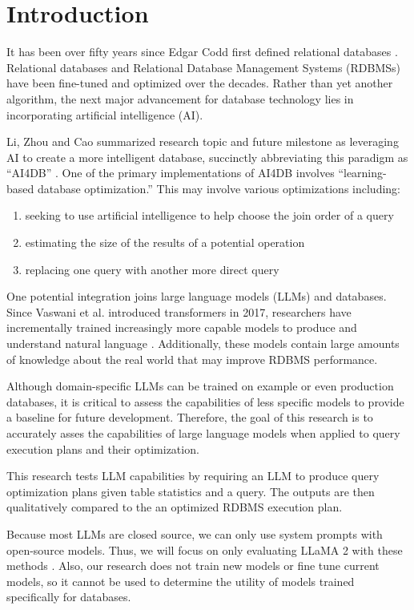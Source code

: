 \section{Introduction}
It has been over fifty years since Edgar Codd first defined relational databases \cite{codd1970}. Relational databases and Relational Database Management Systems (RDBMSs) have been fine-tuned and optimized over the decades. Rather than yet another algorithm, the next major advancement for database technology lies in incorporating artificial intelligence (AI).

Li, Zhou and Cao summarized research topic and future milestone as leveraging AI to create a more intelligent database, succinctly abbreviating this paradigm as ``AI4DB'' \cite{li2021}. One of the primary implementations of AI4DB involves ``learning-based database optimization.'' This may involve various optimizations including:

\begin{enumerate}
  \item seeking to use artificial intelligence to help choose the join order of a query
  \item estimating the size of the results of a potential operation
  \item replacing one query with another more direct query
\end{enumerate}

One potential integration joins large language models (LLMs) and databases. Since Vaswani et al. introduced transformers in 2017, researchers have incrementally trained increasingly more capable models to produce and understand natural language \cite{vaswani2017}. Additionally, these models contain large amounts of knowledge about the real world that may improve RDBMS performance.

Although domain-specific LLMs can be trained on example or even production databases, it is critical to assess the capabilities of less specific models to provide a baseline for future development. Therefore, the goal of this research is to accurately asses the capabilities of large language models when applied to query execution plans and their optimization.

This research tests LLM capabilities by requiring an LLM to produce query optimization plans given table statistics and a query. The outputs are then qualitatively compared to the an optimized RDBMS execution plan.

Because most LLMs are closed source, we can only use system prompts with open-source models. Thus, we will focus on only evaluating LLaMA 2 with these methods \cite{touvron2023}. Also, our research does not train new models or fine tune current models, so it cannot be used to determine the utility of models trained specifically for databases.


